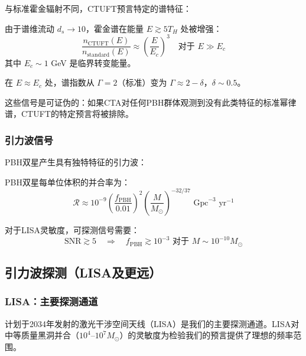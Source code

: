 与标准霍金辐射不同，CTUFT预言特定的谱特征：

\begin{prediction}[高能尾部增强]
由于谱维流动 $d_s \to 10$，霍金谱在能量 $E \gtrsim 5 T_H$ 处被增强：
\begin{equation}
    \frac{n_{\text{CTUFT}}(E)}{n_{\text{standard}}(E)} \approx \left(\frac{E}{E_c}\right)^{3} \quad \text{对于 } E \gg E_c
\end{equation}
其中 $E_c \sim 1$ GeV 是临界转变能量。
\end{prediction}

\begin{prediction}[谱中的断裂]
在 $E \approx E_c$ 处，谱指数从 $\Gamma = 2$（标准）变为 $\Gamma \approx 2 - \delta$，$\delta \sim 0.5$。
\end{prediction}

这些信号是可证伪的：如果CTA对任何PBH群体观测到没有此类特征的标准幂律谱，CTUFT的特定预言将被排除。

\subsubsection{引力波信号}

PBH双星产生具有独特特征的引力波：

\begin{theorem}[PBH并合率]
PBH双星每单位体积的并合率为：
\begin{equation}
    \mathcal{R} \approx 10^{-9} \left(\frac{f_{\text{PBH}}}{0.01}\right)^2 \left(\frac{M}{M_\odot}\right)^{-32/37} \text{ Gpc}^{-3} \text{ yr}^{-1}
\end{equation}
\end{theorem}

对于LISA灵敏度，可探测信号需要：
\begin{equation}
    \text{SNR} \gtrsim 5 \quad \Rightarrow \quad f_{\text{PBH}} \gtrsim 10^{-3} \text{ 对于 } M \sim 10^{-10} M_\odot
\end{equation}

\subsection{引力波探测（LISA及更远）}

\subsubsection{LISA：主要探测通道}

计划于2034年发射的激光干涉空间天线（LISA）是我们的主要探测通道。LISA对中等质量黑洞并合（$10^4$--$10^7 M_\odot$）的灵敏度为检验我们的预言提供了理想的频率范围。

